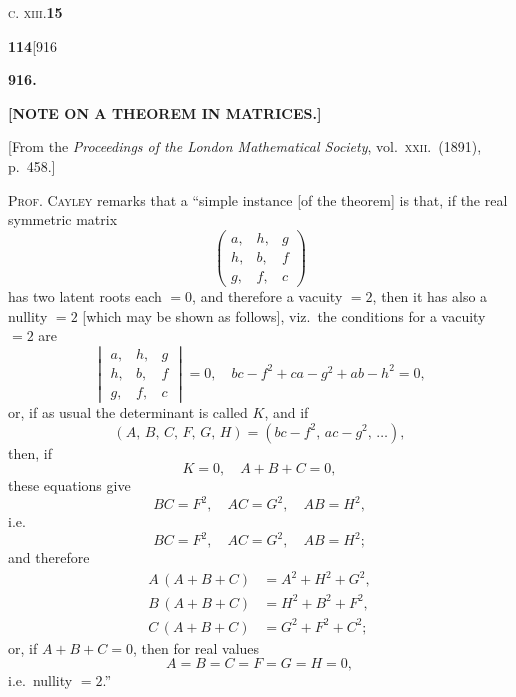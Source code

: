 \documentclass[11pt]{article}
\begin{document}
\medskip
\noindent\textsc{c. xiii.}\hfill\textbf{15}

\newpage
\noindent\textbf{114}\hfill\hfill[916

\vspace{2em}
\begin{center}\large\textbf{916.}\end{center}
\vspace{1em}
\begin{center}\large\textbf{[NOTE ON A THEOREM IN MATRICES.]}\end{center}
\vspace{0.5em}
\begin{center}\small[From the \emph{Proceedings of the London Mathematical Society},
vol.\ \textsc{xxii}.\ (1891), p.\ 458.]\end{center}
\vspace{1em}

\hspace{1em} P\textsc{rof}. C\textsc{ayley} remarks that a ``simple instance
[of the theorem] is that, if the real symmetric matrix
\[
\begin{pmatrix}
a, & h, & g\\
h, & b, & f\\
g, & f, & c
\end{pmatrix}
\]
has two latent roots each $=0$, and therefore a vacuity $=2$, then it has
also a nullity $=2$ [which may be shown as follows], viz.\ the conditions for
a vacuity $=2$ are
\[
\begin{vmatrix}
a, & h, & g\\
h, & b, & f\\
g, & f, & c
\end{vmatrix}=0,\quad bc-f^{2}+ca-g^{2}+ab-h^{2}=0,
\]
or, if as usual the determinant is called $K$, and if
\[
(A,\,B,\,C,\,F,\,G,\,H)=(bc-f^{2},\,ac-g^{2},\,\ldots),
\]
then, if
\[
K=0,\quad A+B+C=0,
\]
these equations give
\[
BC=F^{2},\quad AC=G^{2},\quad AB=H^{2},
\]
i.e.
\[
BC=F^{2},\quad AC=G^{2},\quad AB=H^{2};
\]
and therefore
\begin{align*}
A\,(A+B+C) &= A^{2}+H^{2}+G^{2},\\
B\,(A+B+C) &= H^{2}+B^{2}+F^{2},\\
C\,(A+B+C) &= G^{2}+F^{2}+C^{2};
\end{align*}
or, if $A+B+C=0$, then for real values
\[
A=B=C=F=G=H=0,
\]
i.e.\ nullity $=2$.''
\end{document}
